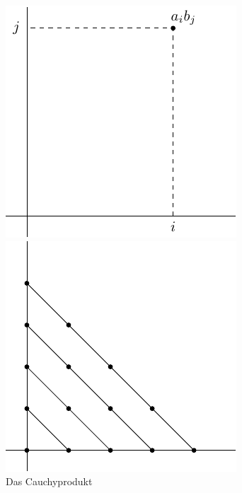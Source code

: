 \documentclass[../main.tex]{subfiles}
\begin{document}
\begin{figure}[htb] 
  \centering
  \begin{minipage}{0.50\textwidth}
    \centering
\includegraphics{images/cauchy1}
  \end{minipage}%
  \begin{minipage}{0.50\textwidth}
    \centering
    \includegraphics{images/cauchy2}
  \end{minipage}%
  \caption{Das Cauchyprodukt}%
  \label{fig:cauchy}
\end{figure}
\end{document}
